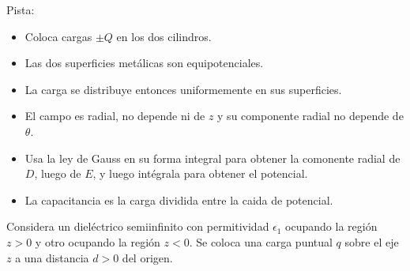 \documentclass{exam}
\begin{document}
\begin{questions}
  Pista:
  \begin{itemize}
  \item Coloca cargas $\pm Q$ en los dos cilindros.
  \item Las dos superficies metálicas son equipotenciales.
  \item La carga se distribuye entonces uniformemente en sus
    superficies.
  \item El campo es radial, no depende ni de $z$ y su componente
    radial no depende de $\theta$.
  \item Usa la ley de Gauss en su forma integral para obtener la
    comonente radial de $D$, luego de $E$, y luego intégrala para
    obtener el potencial.
  \item La capacitancia es la carga dividida entre la caida de
    potencial.
  \end{itemize}

  \question Considera un dieléctrico semiinfinito con permitividad
  $\epsilon_1$ ocupando la región $z>0$ y otro ocupando la región
  $z<0$. Se coloca una carga puntual $q$ sobre el eje $z$ a una
  distancia $d>0$ del origen.
  \begin{parts}

\end{parts}
\end{questions}
\end{document}
